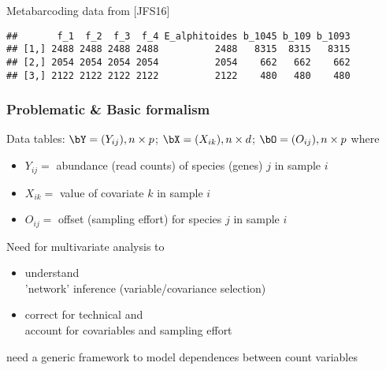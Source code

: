 \begin{frame}[fragile]
\begin{block}{Metabarcoding data from [JFS16]}
\begin{itemize}
\begin{knitrout}
\color{fgcolor}\begin{kframe}
\begin{alltt}
\hlstd{offsets[}\hlopt{:}\hlstd{,} \hlstd{(}\hlopt{:}\hlstd{,} \hlopt{:}\hlstd{)]}
\end{alltt}
\begin{verbatim}
##       f_1  f_2  f_3  f_4 E_alphitoides b_1045 b_109 b_1093
## [1,] 2488 2488 2488 2488          2488   8315  8315   8315
## [2,] 2054 2054 2054 2054          2054    662   662    662
## [3,] 2122 2122 2122 2122          2122    480   480    480
\end{verbatim}
\end{kframe}
\end{knitrout}
    \end{itemize}
  \end{block}

\end{frame}

\begin{frame}
  \frametitle{Problematic \& Basic formalism}
  
  \begin{block}{Data tables: $\bY = (Y_{ij}), n \times p$;  $\bX = (X_{ik}), n \times d$; $\bO = (O_{ij}), n \times p$ where}
    \vspace{-.25cm}
    \begin{itemize}
    \item $Y_{ij} = $ abundance (read counts) of species (genes) $j$ in sample $i$
    \item $X_{ik} = $ value of covariate $k$ in sample $i$
    \item $O_{ij} = $ offset (sampling effort) for species $j$ in sample $i$
    \end{itemize}
  \end{block}

  \vfill

  \begin{block}{Need for multivariate analysis to}
    \vspace{-.25cm}
    \begin{itemize}
    \item understand  \\
      \rsa 'network' inference (variable/covariance selection)
    \item correct for technical and  \\
      \rsa account for covariables and sampling effort
    \end{itemize}
  \end{block}

  \rsa need a generic framework to \alert{model dependences between count variables}

\end{frame}

